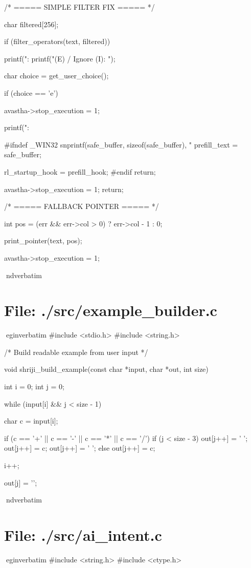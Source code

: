 \documentclass{article}
\begin{document}
{    /* ===== SIMPLE FILTER FIX ===== */

    char filtered[256];

    if (filter_operators(text, filtered))
    {
        printf("\nSuggestion: %
        printf("\nEdit (E) / Ignore (I): ");

        char choice = get_user_choice();

        if (choice == 'e')
        {
            avastha->stop_execution = 1;

            printf("\nEdit:\n%

#ifndef _WIN32
            snprintf(safe_buffer, sizeof(safe_buffer), "%
            prefill_text = safe_buffer;

            rl_startup_hook = prefill_hook;
#endif
            return;
        }

        avastha->stop_execution = 1;
        return;
    }

    /* ===== FALLBACK POINTER ===== */

    int pos = (err && err->col > 0) ? err->col - 1 : 0;

    print_pointer(text, pos);

    avastha->stop_execution = 1;
}
nd{verbatim}
\section*{File: ./src/example_builder.c}
egin{verbatim}
#include <stdio.h>
#include <string.h>

/*
    Build readable example from user input
*/

void shriji_build_example(const char *input, char *out, int size)
{
    int i = 0;
    int j = 0;

    while (input[i] && j < size - 1)
    {
        char c = input[i];

        if (c == '+' || c == '-' || c == '*' || c == '/')
        {
            if (j < size - 3)
            {
                out[j++] = ' ';
                out[j++] = c;
                out[j++] = ' ';
            }
        }
        else
        {
            out[j++] = c;
        }

        i++;
    }

    out[j] = '\0';
}
nd{verbatim}
\section*{File: ./src/ai_intent.c}
egin{verbatim}
#include <string.h>
#include <ctype.h>
\end{document}
